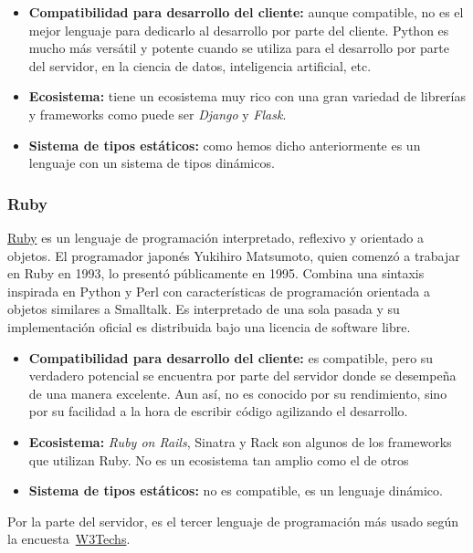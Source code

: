 \begin{itemize}
    \item[\mal] \textbf{Compatibilidad para desarrollo del cliente:} aunque compatible, no es el mejor lenguaje para dedicarlo al desarrollo por parte del cliente. Python es mucho más versátil y potente cuando se utiliza para el desarrollo por parte del servidor, en la ciencia de datos, inteligencia artificial, etc.
    \item[\bien] \textbf{Ecosistema:} tiene un ecosistema muy rico con una gran variedad de librerías y frameworks como puede ser \textit{Django} y \textit{Flask}.
    \item[\mal] \textbf{Sistema de tipos estáticos:} como hemos dicho anteriormente es un lenguaje con un sistema de tipos dinámicos.
\end{itemize}

\subsubsection{Ruby}

\href{https://es.wikipedia.org/w/index.php?title=Ruby&oldid=159723570}{Ruby} es un lenguaje de programación interpretado, reflexivo y orientado a objetos. El programador japonés Yukihiro Matsumoto, quien comenzó a trabajar en Ruby en 1993, lo presentó públicamente en 1995. Combina una sintaxis inspirada en Python y Perl con características de programación orientada a objetos similares a Smalltalk. Es interpretado de una sola pasada y su implementación oficial es distribuida bajo una licencia de software libre.

\begin{itemize}
    \item[\mal] \textbf{Compatibilidad para desarrollo del cliente:} es compatible, pero su verdadero potencial se encuentra por parte del servidor donde se desempeña de una manera excelente. Aun así, no es conocido por su rendimiento, sino por su facilidad a la hora de escribir código agilizando el desarrollo.
    \item[\bien] \textbf{Ecosistema:} \textit{Ruby on Rails}, Sinatra y Rack son algunos de los frameworks que utilizan Ruby. No es un ecosistema tan amplio como el de otros 
    \item[\mal] \textbf{Sistema de tipos estáticos:} no es compatible, es un lenguaje dinámico.
\end{itemize}

Por la parte del servidor, es el tercer lenguaje de programación más usado según la encuesta~\href{https://w3techs.com/technologies/overview/programming_language}{W3Techs}.

